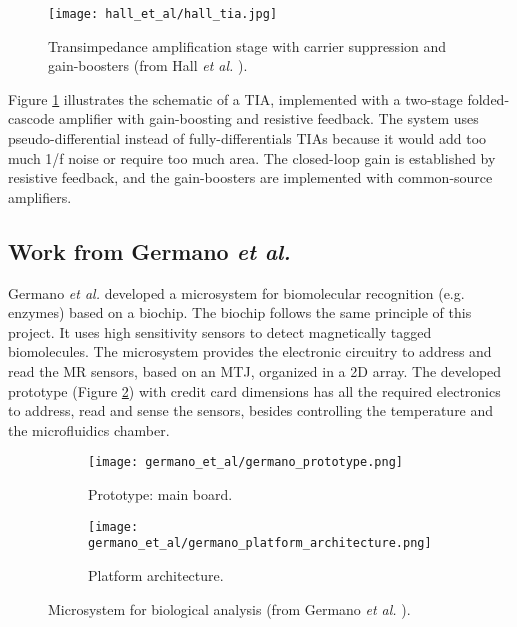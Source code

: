 \begin{figure}[!ht]
    \centering
    \texttt{[image: hall\_et\_al/hall\_tia.jpg]}
    \caption{Transimpedance amplification stage with carrier suppression and gain-boosters (from Hall \textit{et al.} \cite{PMID24761029}).}
    \label{figure:hall-tia}
\end{figure}

Figure \ref{figure:hall-tia} illustrates the schematic of a \ac{TIA}, implemented with a two-stage folded-cascode amplifier with gain-boosting and resistive feedback. The system uses pseudo-differential instead of fully-differentials \ac{TIA}s because it would add too much 1/f noise or require too much area. The closed-loop gain is established by resistive feedback, and the gain-boosters are implemented with common-source amplifiers.

\subsection{Work from Germano \textit{et al.}}

Germano \textit{et al.} \cite{Germano2006MICROSYSTEMFB} developed a microsystem for biomolecular recognition (e.g. enzymes) based on a biochip. The biochip follows the same principle of this project. It uses high sensitivity sensors to detect magnetically tagged biomolecules. The microsystem provides the electronic circuitry to address and read the \ac{MR} sensors, based on an \ac{MTJ}, organized in a \ac{2D} array. The developed prototype (Figure \ref{figure:germano-prototype}) with credit card dimensions has all the required electronics to address, read and sense the sensors, besides controlling the temperature and the microfluidics chamber.

\begin{figure}[!ht]
    \centering
    \begin{subfigure}[b]{.48\textwidth}
        \centering
        \texttt{[image: germano\_et\_al/germano\_prototype.png]}
        \caption{Prototype: main board.}
        \label{figure:germano-prototype}
    \end{subfigure}
    \hfill
    \centering
    \begin{subfigure}[b]{.48\textwidth}
        \centering
        \texttt{[image: germano\_et\_al/germano\_platform\_architecture.png]}
        \caption{Platform architecture.}
        \label{figure:germano-architecture}
    \end{subfigure}
    \caption{Microsystem for biological analysis (from Germano \textit{et al.} \cite{Germano2006MICROSYSTEMFB}).}
    \label{figure:germano-system}
\end{figure}

